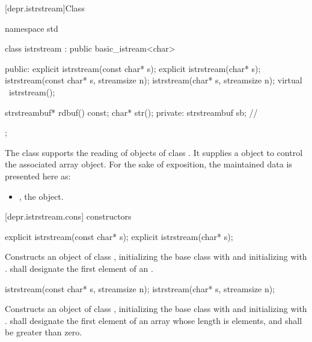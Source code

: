 [depr.istrstream]{Class }

%
\begin{codeblock}
namespace std {
  class istrstream : public basic_istream<char> {
  public:
    explicit istrstream(const char* s);
    explicit istrstream(char* s);
    istrstream(const char* s, streamsize n);
    istrstream(char* s, streamsize n);
    virtual ~istrstream();

    strstreambuf* rdbuf() const;
    char* str();
  private:
    strstreambuf sb;  // \expos
  };
}
\end{codeblock}

\pnum
The class
supports the reading of objects of class
.
It supplies a
object to control the associated array object.
For the sake of exposition, the maintained data is presented here as:

\begin{itemize}
\item
{}, the  object.
\end{itemize}

[depr.istrstream.cons]{ constructors}

%
\begin{itemdecl}
explicit istrstream(const char* s);
explicit istrstream(char* s);
\end{itemdecl}

\begin{itemdescr}
\pnum
\effects
Constructs an object of class
,
initializing the base class with
and initializing  with
.
 shall designate the first element of an \ntbs.%
\end{itemdescr}

%
\begin{itemdecl}
istrstream(const char* s, streamsize n);
istrstream(char* s, streamsize n);
\end{itemdecl}

\begin{itemdescr}
\pnum
\effects
Constructs an object of class
,
initializing the base class with
and initializing  with
.
 shall designate the first element of an array whose length is
 elements, and  shall be greater than zero.
\end{itemdescr}

